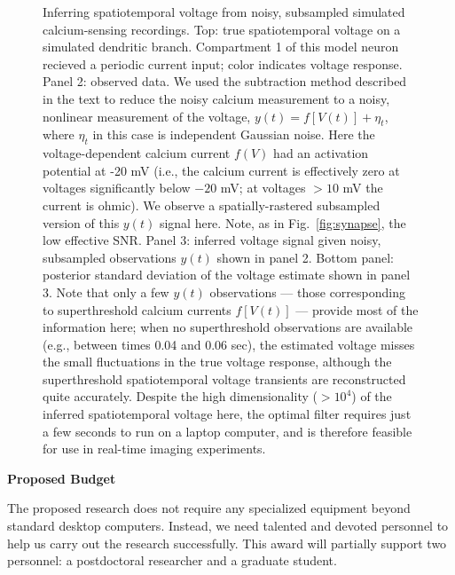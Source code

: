 \documentclass[12pt]{article}
\begin{document}
\begin{figure}[p]
\begin{center}
\epsfxsize=5.4in
\caption{\small Inferring spatiotemporal voltage from noisy,
subsampled simulated calcium-sensing recordings.  Top: true
spatiotemporal voltage on a simulated dendritic branch.  Compartment 1
of this model neuron recieved a periodic current input; color
indicates voltage response.  Panel 2: observed data.  We used the
subtraction method described in the text to reduce the noisy calcium
measurement to a noisy, nonlinear measurement of the voltage, $y(t) =
f[V(t)] + \eta_t$, where $\eta_t$ in this case is independent Gaussian
noise.  Here the voltage-dependent calcium current $f(V)$ had an
activation potential at -20 mV (i.e., the calcium current is
effectively zero at voltages significantly below $-20$ mV; at voltages
$>10$ mV the current is ohmic).  We observe a spatially-rastered
subsampled version of this $y(t)$ signal here.  Note, as in
Fig.~\ref{fig:synapse}, the low effective SNR.  Panel 3: inferred
voltage signal given noisy, subsampled observations $y(t)$ shown in
panel 2.  Bottom panel: posterior standard deviation of the voltage
estimate shown in panel 3.  Note that only a few $y(t)$ observations
--- those corresponding to superthreshold calcium currents $f[V(t)]$
--- provide most of the information here; when no superthreshold
observations are available (e.g., between times 0.04 and 0.06 sec),
the estimated voltage misses the small fluctuations in the true
voltage response, although the superthreshold spatiotemporal voltage
transients are reconstructed quite accurately.  Despite the high
dimensionality ($>10^4$) of the inferred spatiotemporal voltage here,
the optimal filter requires just a few seconds to run on a laptop
computer, and is therefore feasible for use in real-time imaging
experiments.}
\label{fig:ca_to_v}
\end{center}
\end{figure}

\clearpage
%




\clearpage

\noindent \textbf{Proposed Budget}

The proposed research does not require any specialized equipment
beyond standard desktop computers.  Instead, we need talented and
devoted personnel to help us carry out the research successfully.
This award will partially support two personnel: a postdoctoral
researcher and a graduate student.
\end{document}
